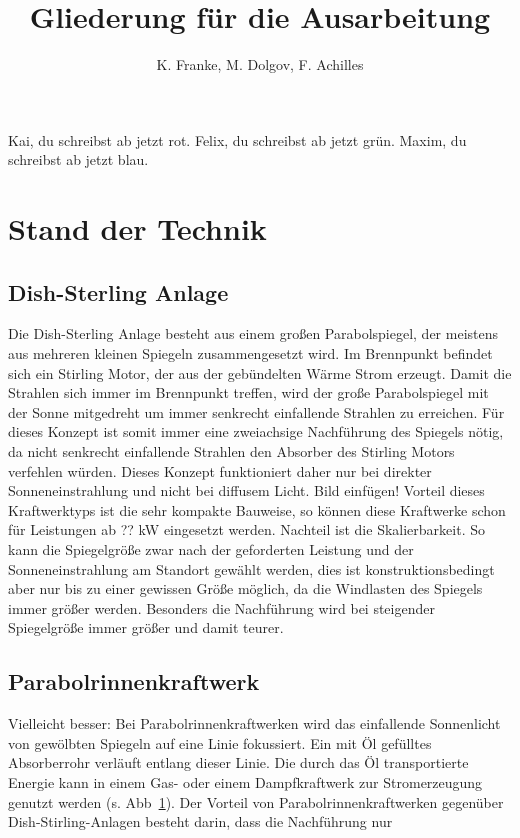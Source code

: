 \documentclass[fontsize=10pt,paper=a4,bibliography=totoc]{scrartcl}
\title{Gliederung für die Ausarbeitung}
\author{K. Franke, M. Dolgov, F. Achilles}
\newcommand{\kai}[1]{{ \color{red} #1 }}
\newcommand{\felix}[1]{{ \color{green} #1}}
\newcommand{\maxim}[1]{{ \color{blue} #1}}
\begin{document}
\maketitle
%
\kai{Kai, du schreibst ab jetzt rot.}\newline
\felix{Felix, du schreibst ab jetzt grün.}\newline
\maxim{Maxim, du schreibst ab jetzt blau.}\newline

\section{Stand der Technik}

\subsection{Dish-Sterling Anlage}

Die Dish-Sterling Anlage besteht aus einem großen Parabolspiegel, der meistens aus mehreren kleinen Spiegeln zusammengesetzt wird. Im Brennpunkt befindet sich ein Stirling Motor, der aus der gebündelten Wärme Strom erzeugt. Damit die Strahlen sich immer im Brennpunkt treffen, wird der große Parabolspiegel mit der Sonne mitgedreht um immer senkrecht einfallende Strahlen zu erreichen. Für dieses Konzept ist somit immer eine zweiachsige Nachführung des Spiegels nötig, da nicht senkrecht einfallende Strahlen den Absorber des Stirling Motors verfehlen würden. Dieses Konzept funktioniert daher nur bei direkter Sonneneinstrahlung und nicht bei diffusem Licht. Bild einfügen! Vorteil dieses Kraftwerktyps ist die sehr kompakte Bauweise, so können diese Kraftwerke schon für Leistungen ab ?? kW eingesetzt werden. Nachteil ist die Skalierbarkeit. So kann die Spiegelgröße zwar nach der geforderten Leistung und der Sonneneinstrahlung am Standort gewählt werden, dies ist konstruktionsbedingt aber nur bis zu einer gewissen Größe möglich, da die Windlasten des Spiegels immer größer werden. Besonders die Nachführung wird bei steigender Spiegelgröße immer größer und damit teurer. 

\subsection{Parabolrinnenkraftwerk}

\maxim{Vielleicht besser: Bei Parabolrinnenkraftwerken wird das einfallende Sonnenlicht von gewölbten Spiegeln auf eine Linie fokussiert. Ein mit Öl gefülltes Absorberrohr verläuft entlang dieser Linie. Die durch das Öl transportierte Energie kann in einem Gas- oder einem Dampfkraftwerk zur Stromerzeugung genutzt werden (s. Abb~\ref{pic:parabolrinnen}). Der Vorteil von Parabolrinnenkraftwerken gegenüber Dish-Stirling-Anlagen besteht darin, dass die Nachführung nur 

\begin{figure}[h]
	\centering
	\def\svgwidth{.6\textwidth}
	
	\label{pic:parabolrinnen}
\end{figure}
}\hfill\newline\newline
\end{document}
